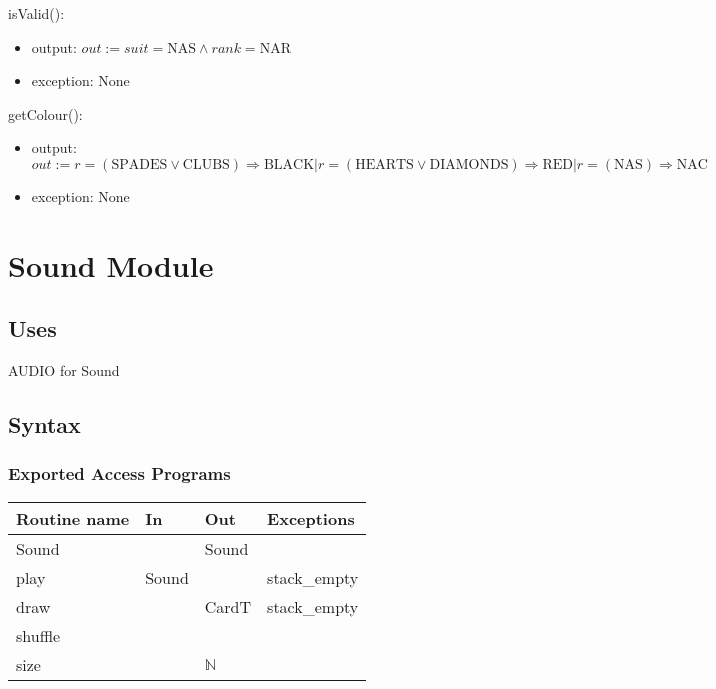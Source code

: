 \documentclass[12pt]{article}
\newcommand{\means}{\Rightarrow}
\newcommand{\m}[1]{\mbox{#1}}
\begin{document}
\noindent isValid():
\begin{itemize}
    \item output: $out := suit=\m{NAS} \land rank=\m{NAR}$
    \item exception: None
\end{itemize}

\noindent getColour():
\begin{itemize}
    \item output: $out := r=(\m{SPADES} \lor \m{CLUBS}) \means \m{BLACK} | r=(\m{HEARTS} \lor \m{DIAMONDS}) \means \m{RED} | r=(\m{NAS}) \means \m{NAC}$
    \item exception: None
\end{itemize}

\newpage

\section*{Sound Module}

\subsection*{Uses}

AUDIO for Sound\\

\subsection*{Syntax}

\subsubsection*{Exported Access Programs}

\begin{tabular}{| l | l | l | l |}
    \hline
    \textbf{Routine name} & \textbf{In} & \textbf{Out} & \textbf{Exceptions}\\
    \hline
    Sound & ~ & Sound & ~\\
    \hline
    play & Sound & ~ & stack\_empty\\
    \hline
    draw & ~ & CardT & stack\_empty\\
    \hline
    shuffle & ~ & ~ & ~\\
    \hline
    size & & $\mathbb{N}$ & ~\\
    \hline
\end{tabular}
\end{document}
